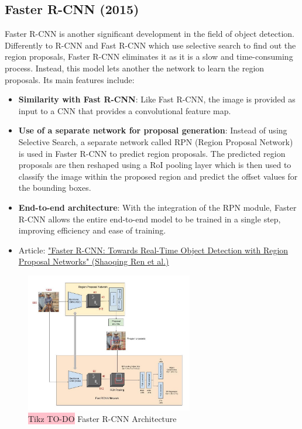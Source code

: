 \subsection{Faster R-CNN (2015)}
Faster R-CNN is another significant development in the field of object detection. Differently to R-CNN and Fast R-CNN which use selective search to find out the region proposals, Faster R-CNN eliminates it as it is a slow and time-consuming process. Instead,  this model lets another the network to learn the region proposals. Its main features include:

\begin{itemize}
    \item \textbf{Similarity with Fast R-CNN}: Like Fast R-CNN, the image is provided as input to a CNN that provides a convolutional feature map.
    \item \textbf{Use of a separate network for proposal generation}: Instead of using Selective Search, a separate network called RPN (Region Proposal Network) is used in Faster R-CNN to predict region proposals. The predicted region proposals are then reshaped using a RoI pooling layer which is then used to classify the image within the proposed region and predict the offset values for the bounding boxes.
    \item \textbf{End-to-end architecture}: With the integration of the RPN module, Faster R-CNN allows the entire end-to-end model to be trained in a single step, improving efficiency and ease of training.
    \item Article: \href{https://arxiv.org/pdf/1506.01497.pdf}{"Faster R-CNN: Towards Real-Time Object Detection with Region Proposal Networks" (Shaoqing Ren et al.)}
\end{itemize}


\begin{figure}[!htbp]
    \centering
    \includegraphics[width=0.65\textwidth]{tikz/chapter5 - Faster R-CNN.jpeg}
    \caption{{\color{red}\colorbox{pink}{Tikz TO-DO}} Faster R-CNN Architecture}
\end{figure}




